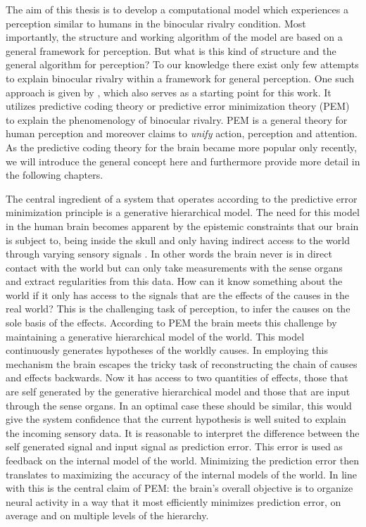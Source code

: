 \documentclass{frontiersSCNS} %
\begin{document}
The aim of this thesis is to develop a computational model which experiences a perception similar to humans in the binocular rivalry condition. Most importantly, the structure and working algorithm of the model are based on a general framework for perception. But what is this kind of structure and the general algorithm for perception? To our knowledge there exist only few attempts to explain binocular rivalry within a framework for general perception. One such approach is given by \cite{Hohwy2008}, which also serves as a starting point for this work. It utilizes predictive coding theory or predictive error minimization theory (PEM) to explain the phenomenology of binocular rivalry. PEM is a general theory for human perception and moreover claims to \textit{unify} action, perception and attention. As the predictive coding theory for the brain became more popular only recently, we will introduce the general concept here and furthermore provide more detail in the following chapters. 

The central ingredient of a system that operates according to the predictive error minimization principle is a generative hierarchical model. The need for this model in the human brain becomes apparent by the epistemic constraints that our brain is subject to, being inside the skull and only having indirect access to the world through varying sensory signals \cite{Clark2013a}. In other words the brain never is in direct contact with the world but can only take measurements with the sense organs and extract regularities from this data. How can it know something about the world if it only has access to the signals that are the effects of the causes in the real world?
    This is the challenging task of perception, to infer the causes on the sole basis of the effects.
    According to PEM the brain meets this challenge by maintaining a generative hierarchical model of the world. This model continuously generates hypotheses of the worldly causes.
    In employing this mechanism the brain escapes the tricky task of reconstructing the chain of causes and effects backwards. Now it has access to two quantities of effects, those that are self generated by the generative hierarchical model and those that are input through the sense organs. In an optimal case these should be similar, this would give the system confidence that the current hypothesis is well suited to explain the incoming sensory data. It is reasonable to interpret the difference between the self generated signal and input signal as prediction error. This error is used as feedback on the internal model of the world. Minimizing the prediction error then translates to maximizing the accuracy of the internal models of the world. In line with this is the central claim of PEM: the brain's overall objective is to organize neural activity in a way that it most efficiently minimizes prediction error, on average and on multiple levels of the hierarchy. \cite{Hohwy2013} 
\end{document}
